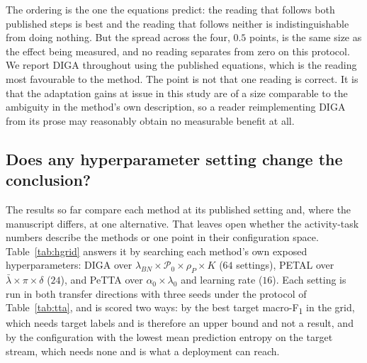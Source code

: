 \documentclass[a4paper,fleqn]{cas-dc}
\newcommand{\macf}{macro-F\textsubscript{1}}
\begin{document}
The ordering is the one the equations predict: the reading that follows both published
steps is best and the reading that follows neither is indistinguishable from doing
nothing. But the spread across the four, $0.5$ points, is the same size as the effect
being measured, and no reading separates from zero on this protocol. We report DIGA
throughout using the published equations, which is the reading most favourable to the
method. The point is not that one reading is correct. It is that the adaptation gains at
issue in this study are of a size comparable to the ambiguity in the method's own
description, so a reader reimplementing DIGA from its prose may reasonably obtain no
measurable benefit at all.

\subsection{Does any hyperparameter setting change the conclusion?}
\label{sec:res-hgrid}

The results so far compare each method at its published setting and, where the manuscript
differs, at one alternative. That leaves open whether the activity-task numbers describe
the methods or one point in their configuration space. Table~\ref{tab:hgrid} answers it by
searching each method's own exposed hyperparameters: DIGA over
$\lambda_{BN}\times\mathcal{P}_0\times\rho_P\times K$ ($64$ settings), PETAL over
$\bar\lambda\times\pi\times\delta$ ($24$), and PeTTA over $\alpha_0\times\lambda_0$ and
learning rate ($16$). Each setting is run in both transfer directions with three seeds
under the protocol of Table~\ref{tab:tta}, and is scored two ways: by the best target
\macf{} in the grid, which needs target labels and is therefore an upper bound and not
a result, and by the configuration with the lowest mean prediction entropy on the target
stream, which needs none and is what a deployment can reach.
\end{document}

